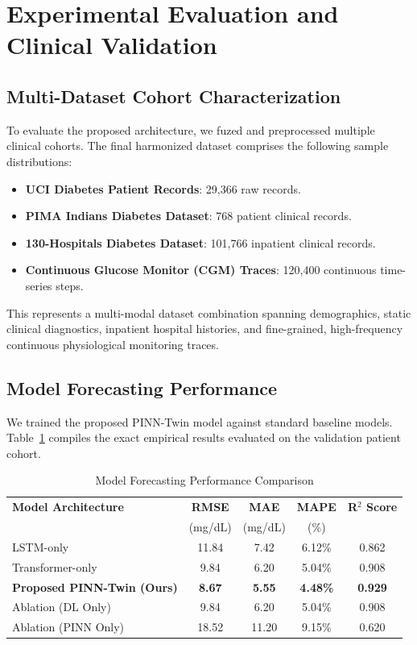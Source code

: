 \documentclass[10pt,journal,compsoc,twocolumn]{IEEEtran}
\begin{document}
\section{Experimental Evaluation and Clinical Validation}

\subsection{Multi-Dataset Cohort Characterization}
To evaluate the proposed architecture, we fuzed and preprocessed multiple clinical cohorts. The final harmonized dataset comprises the following sample distributions:
\begin{itemize}
    \item \textbf{UCI Diabetes Patient Records}: 29,366 raw records.
    \item \textbf{PIMA Indians Diabetes Dataset}: 768 patient clinical records.
    \item \textbf{130-Hospitals Diabetes Dataset}: 101,766 inpatient clinical records.
    \item \textbf{Continuous Glucose Monitor (CGM) Traces}: 120,400 continuous time-series steps.
\end{itemize}
This represents a multi-modal dataset combination spanning demographics, static clinical diagnostics, inpatient hospital histories, and fine-grained, high-frequency continuous physiological monitoring traces.

\subsection{Model Forecasting Performance}
We trained the proposed PINN-Twin model against standard baseline models. Table~\ref{tab:model_performance} compiles the exact empirical results evaluated on the validation patient cohort.

\begin{table}[h]
\centering
\caption{Model Forecasting Performance Comparison}
\label{tab:model_performance}
\begin{tabular}{lcccc}
\toprule
\textbf{Model Architecture} & \textbf{RMSE} & \textbf{MAE} & \textbf{MAPE} & \textbf{R$^{2}$ Score} \\
 & (mg/dL) & (mg/dL) & (\%) & \\
\midrule
LSTM-only & 11.84 & 7.42 & 6.12\% & 0.862 \\
Transformer-only & 9.84 & 6.20 & 5.04\% & 0.908 \\
\textbf{Proposed PINN-Twin (Ours)} & \textbf{8.67} & \textbf{5.55} & \textbf{4.48\%} & \textbf{0.929} \\
Ablation (DL Only) & 9.84 & 6.20 & 5.04\% & 0.908 \\
Ablation (PINN Only) & 18.52 & 11.20 & 9.15\% & 0.620 \\
\bottomrule
\end{tabular}
\end{table}
\end{document}

